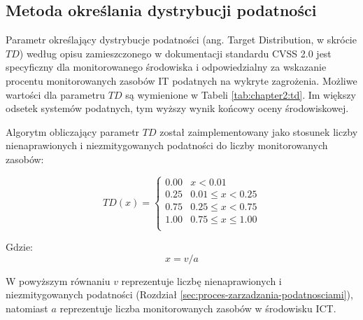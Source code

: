
\subsection{Metoda określania dystrybucji podatności}
\label{sec:td}
Parametr określający dystrybucje podatności (ang. Target Distribution, w skrócie $TD$) według opisu zamieszczonego w dokumentacji standardu CVSS 2.0 \cite{cvsspecification} jest specyficzny dla monitorowanego środowiska i odpowiedzialny za wskazanie procentu monitorowanych zasobów IT podatnych na wykryte zagrożenia. Możliwe wartości dla parametru $TD$ są wymienione w Tabeli \ref{tab:chapter2:td}. Im większy odsetek systemów podatnych, tym wyższy wynik końcowy oceny środowiskowej.

\bigbreak
Algorytm obliczający parametr $TD$ został zaimplementowany jako stosunek liczby nienaprawionych i niezmitygowanych podatności do liczby monitorowanych zasobów:

\begin{equation}
TD(x) = 
\begin{cases}
0.00 & x < 0.01 \\
0.25 & 0.01 \leq x < 0.25 \\
0.75 & 0.25 \leq x < 0.75 \\
1.00 & 0.75 \leq x \leq 1.00 \\
\end{cases}
\end{equation}

Gdzie:
\begin{equation}
    x = v / a 
\end{equation}

W powyższym równaniu $v$ reprezentuje liczbę nienaprawionych i niezmitygowanych podatności (Rozdział \ref{sec:proces-zarzadzania-podatnosciami}), natomiast $a$ reprezentuje liczba monitorowanych zasobów w środowisku ICT.


